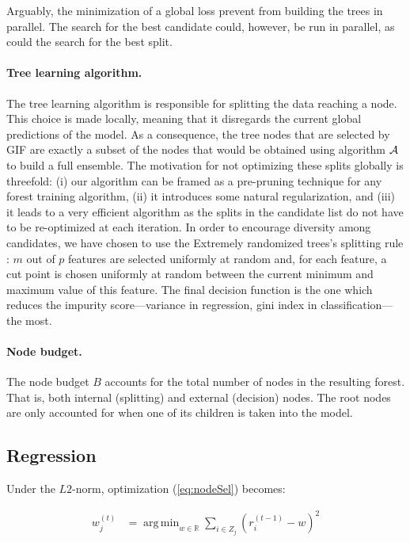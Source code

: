 \documentclass{article}
\DeclareMathOperator*{\argmin}{arg\,min}
\begin{document}
Arguably, the minimization of a global loss prevent from building the trees in 
parallel. The search for the best candidate could, however, be run in parallel, 
as could the search for the best split. 

\paragraph{Tree learning algorithm.}
The tree learning algorithm is responsible for splitting the data
reaching a node. This choice is made locally, meaning that it
disregards the current global predictions of the model. As a
consequence, the tree nodes that are selected by GIF are exactly a
subset of the nodes that would be obtained using algorithm ${\cal A}$
to build a full ensemble. The motivation for not optimizing these
splits globally is threefold: (i) our algorithm can be framed as a
pre-pruning technique for any forest training algorithm, (ii) it
introduces some natural regularization, and (iii) it leads to a very
efficient algorithm as the splits in the candidate list do not have to
be re-optimized at each iteration. In order to encourage diversity
among candidates, we have chosen to use the Extremely randomized
trees's splitting rule \cite{extratrees}: $m$ out of $p$ features are
selected uniformly at random and, for each feature, a cut point is
chosen uniformly at random between the current minimum and maximum
value of this feature. The final decision function is the one which
reduces the impurity score---variance in regression, gini index in
classification---the most.

\paragraph{Node budget.}
The node budget $B$ accounts for the total number of nodes in the resulting 
forest. That is, both internal (splitting) and external (decision) nodes. The 
root nodes are only accounted for when one of its children is taken into the 
model.


\subsection{Regression}
\label{subsec:regression}

Under the $L2$-norm, optimization (\ref{eq:nodeSel}) becomes:

\vspace*{-\baselineskip}
\begin{align}\label{eq:L2min}
w_j^{(t)} &=  \argmin_{w \in \mathbb{R}} \sum_{i \in Z_j} \left(r_i^{(t-1)} - 
w\right)^2
\end{align}
\vspace*{-\baselineskip}
\end{document}
